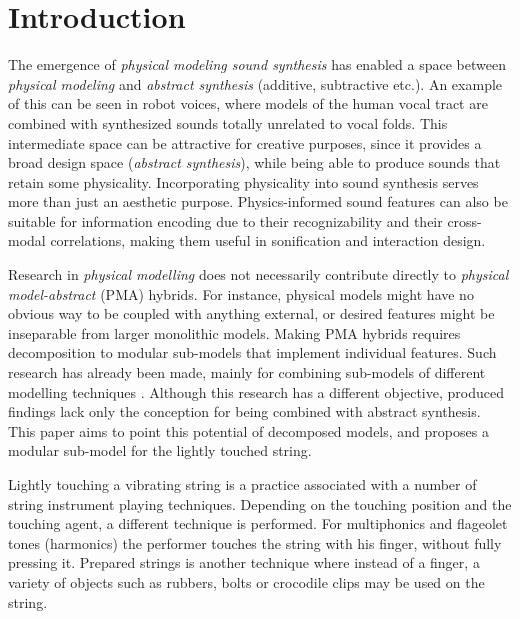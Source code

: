 \documentclass{sigchi}
\def\plainkeywords{physical modelling; audio features}
\begin{document}

\keywords{\plainkeywords}

\printccsdesc

\section{Introduction}

The emergence of \textit{physical modeling sound synthesis} has enabled a space between \textit{physical modeling} and \textit{abstract synthesis} (additive, subtractive etc.). An example of this can be seen in robot voices, where models of the human vocal tract are combined with synthesized sounds totally unrelated to vocal folds. This intermediate space can be attractive for creative purposes, since it provides a broad design space (\textit{abstract synthesis}), while being able to produce sounds that retain some physicality. Incorporating physicality into sound synthesis serves more than just an aesthetic purpose. Physics-informed sound features can also be suitable for information encoding due to their recognizability and their cross-modal correlations, making them useful in sonification and interaction design.

Research in \textit{physical modelling} does not necessarily contribute directly to \textit{physical model-abstract} (PMA) hybrids. For instance, physical models might have no obvious way to be coupled with anything external, or desired features might be inseparable from larger monolithic models. Making PMA hybrids requires decomposition to modular sub-models that implement individual features. Such research has already been made, mainly for combining sub-models of different modelling techniques \cite{erkut_modular_2005,karjalainen_plucked-string_1998}. Although this research has a different objective, produced findings lack only the conception for being combined with abstract synthesis. This paper aims to point this potential of decomposed models, and proposes a modular sub-model for the lightly touched string.

Lightly touching a vibrating string is a practice associated with a number of string instrument playing techniques. Depending on the touching position and the touching agent, a different technique is performed. For multiphonics and flageolet tones (harmonics) the performer touches the string with his finger, without fully pressing it. Prepared strings is another technique where instead of a finger, a variety of objects such as rubbers, bolts or crocodile clips may be used on the string.
\end{document}
